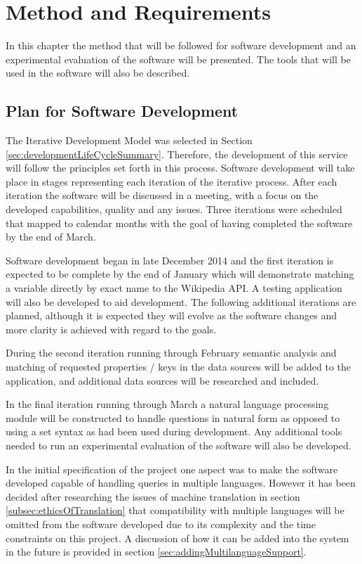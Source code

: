 \documentclass[authoryearcitations]{UoYCSproject}
\begin{document}
\newpage
\chapter{Method and Requirements}
\label{sec:method}

In this chapter the method that will be followed for software development and an experimental evaluation of the software will be presented. The tools that will be used in the software will also be described.

\section{Plan for Software Development}
\label{sec:planForSoftwareDevelopment}
The Iterative Development Model was selected in Section \ref{sec:developmentLifeCycleSummary}.  Therefore, the development of this service will follow the principles set forth in this process. Software development will take place in stages representing each iteration of the iterative process.  After each iteration the software will be discussed in a meeting, with a focus on the developed capabilities, quality and any issues. Three iterations were scheduled that mapped to calendar months with the goal of having completed the software by the end of March.

Software development began in late December 2014 and the first iteration is expected to be complete by the end of January which will demonstrate matching a variable directly by exact name to the Wikipedia API. A testing application will also be developed to aid development. The following additional iterations are planned, although it is expected they will evolve as the software changes and more clarity is achieved with regard to the goals.

During the second iteration running through February semantic analysis and matching of requested properties / keys in the data sources will be added to the application, and additional data sources will be researched and included.

In the final iteration running through March a natural language processing module will be constructed to handle questions in natural form as opposed to using a set syntax as had been used during development. Any additional tools needed to run an experimental evaluation of the software will also be developed.

In the initial specification of the project one aspect was to make the software developed capable of handling queries in multiple languages. However it has been decided after researching the issues of machine translation in section \ref{subsec:ethicsOfTranslation} that compatibility with multiple languages will be omitted from the software developed due to its complexity and the time constraints on this project. A discussion of how it can be added into the system in the future is provided in section \ref{sec:addingMultilanguageSupport}.
\end{document}
